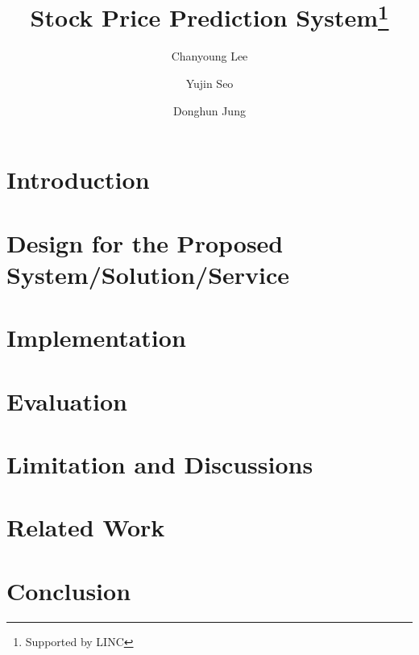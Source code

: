 \documentclass[runningheads]{llncs}
\begin{document}
%
\title{Stock Price Prediction System\thanks{Supported by LINC}}
%
%
\author{Chanyoung Lee \and
Yujin Seo \and
Donghun Jung}
%
%
%
\maketitle              %
%
\begin{abstract}

\end{abstract}

\section{Introduction}
\label{sec:Introduction}


\section{Design for the Proposed System/Solution/Service}
\label{sec:Design}


\section{Implementation}
\label{sec:Implementation}


\section{Evaluation}
\label{sec:Evaluation}


\section{Limitation and Discussions}
\label{sec:Limitation}


\section{Related Work}
\label{sec:Related_Work}


\section{Conclusion}
\label{sec:Conclusion}



\end{document}
